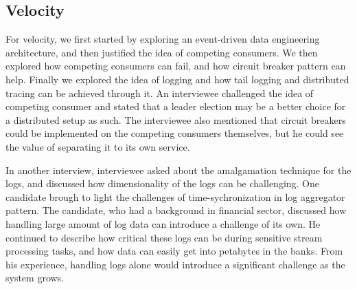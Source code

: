 \documentclass[a4paper,11pt,article,oneside]{memoir}
\begin{document}





\subsection{Velocity}

For velocity, we first started by exploring an event-driven data engineering architecture, and then justified the idea of competing consumers. We then explored how competing consumers can fail, and how circuit breaker pattern can help. Finally we explored the idea of logging and how tail logging and distributed tracing can be achieved through it. An interviewee challenged the idea of competing consumer and stated that a leader election may be a better choice for a distributed setup as such. The interviewee also mentioned that circuit breakers could be implemented on the competing consumers themselves, but he could see the value of separating it to its own service.  

In another interview, interviewee asked about the amalgamation technique for the logs, and discussed how dimensionality of the logs can be challenging. One candidate brough to light the challenges of time-sychronization in log aggregator pattern. The candidate, who had a background in financial sector, discussed how handling large amount of log data can introduce a challenge of its own. He continued to describe how critical these logs can be during sensitive stream processing tasks, and how data can easily get into petabytes in the banks. From his experience, handling logs alone would introduce a significant challenge as the system grows.
\end{document}
